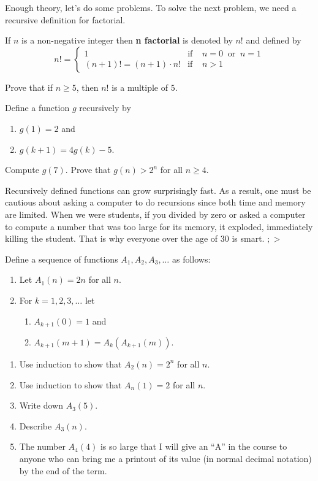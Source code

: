 Enough theory, let's do some problems.  To solve the next problem, we need a recursive definition for factorial.

\begin{dfn}
If $n$ is a non-negative integer then \textbf{n factorial} is denoted by $n!$ and defined by
$$n! =  \left\{
         \begin{array}{ll}
         1 & \mbox{if} \;\;\;\; n=0 \; \; \mbox{or} \; \; n=1 \\
         (n+1)! = (n+1)\cdot n!  & \mbox{if}  \;\;\;\; n > 1
    \end{array}
    \right.$$
\end{dfn}


\begin{prb}
Prove that if $n \ge 5$,  then $n!$  is a multiple of $5$.
\end{prb}

\begin{prb}
Define a function $g$ recursively by
\begin{enumerate}
\item $g(1) = 2$  and
\item $g(k+1) = 4g(k) - 5$.
\end{enumerate}
Compute  $g(7)$.  Prove that $g(n) > 2^n$ for all $n \ge 4$.
\end{prb}

Recursively defined functions can grow surprisingly fast. As a result, one must be cautious about asking a computer to do recursions since both time and memory are limited.  When we were students, if you divided by zero or asked a computer to compute a number that was too large for its memory, it exploded, immediately killing the student.  That is why everyone over the age of 30 is smart.  $;>$

\begin{prb}
Define a sequence of functions $A_1, A_2, A_3,\dots$ as follows:
\begin{enumerate}
\item Let $A_1(n) = 2n$ for all $n$.
\item For $k=1,2,3,\dots$ let
   \begin{enumerate}
     \item $A_{k+1}(0) = 1$  and
     \item $A_{k+1}(m+1) = A_k(A_{k+1}(m))$.
   \end{enumerate}
\end{enumerate}

\begin{enumerate}
\item Use induction to show that $A_2(n) = 2^n$ for all $n$.
\item Use induction to show that $A_n(1) = 2$ for all $n$.
\item Write down $A_3(5)$.
\item Describe  $A_3(n)$.
\item The number $A_4(4)$  is so large that I will give an  ``A''  in the course to anyone who can bring me a
printout of its value (in normal decimal notation) by the end of the term.
\end{enumerate}
\end{prb}

